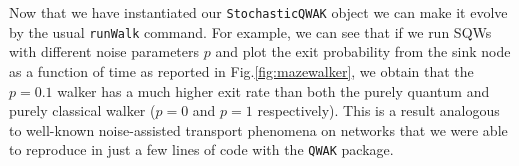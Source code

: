 \documentclass[../../dissertation.tex]{subfiles}
\begin{document}
Now that we have instantiated our \texttt{StochasticQWAK} object we can make it
evolve by the usual \texttt{runWalk} command. For example, we can see that if
we run SQWs with different noise parameters $p$ and plot the exit probability
from the sink node as a function of time as reported in
Fig.\ref{fig:mazewalker}, we obtain that the $p=0.1$ walker has a much higher
exit rate than both the purely quantum and purely classical walker ($p=0$ and
$p=1$ respectively). This is a result analogous to well-known noise-assisted
transport phenomena on networks \cite{Caruso2009, mohseni08} that we were able
to reproduce in just a few lines of code with the  \texttt{QWAK} package.
\end{document}
